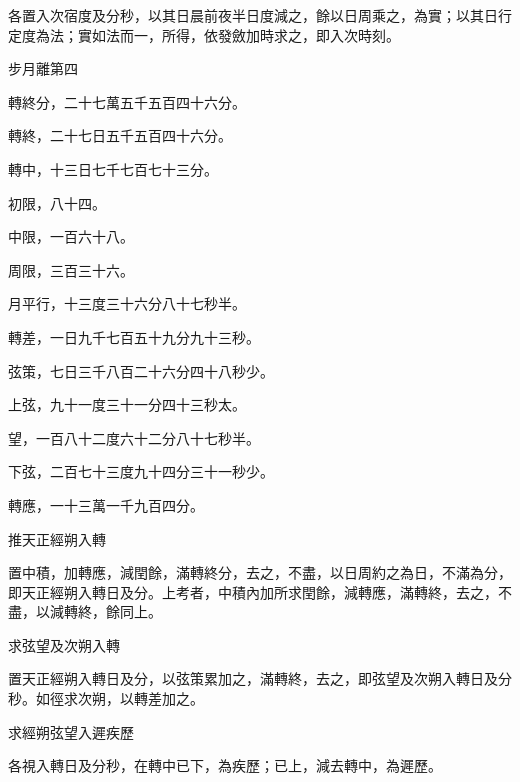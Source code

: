 \begin{pinyinscope}
 各置入次宿度及分秒，以其日晨前夜半日度減之，餘以日周乘之，為實；以其日行定度為法；實如法而一，所得，依發斂加時求之，即入次時刻。



 步月離第四



 轉終分，二十七萬五千五百四十六分。



 轉終，二十七日五千五百四十六分。



 轉中，十三日七千七百七十三分。



 初限，八十四。



 中限，一百六十八。



 周限，三百三十六。



 月平行，十三度三十六分八十七秒半。



 轉差，一日九千七百五十九分九十三秒。



 弦策，七日三千八百二十六分四十八秒少。



 上弦，九十一度三十一分四十三秒太。



 望，一百八十二度六十二分八十七秒半。



 下弦，二百七十三度九十四分三十一秒少。



 轉應，一十三萬一千九百四分。



 推天正經朔入轉



 置中積，加轉應，減閏餘，滿轉終分，去之，不盡，以日周約之為日，不滿為分，即天正經朔入轉日及分。上考者，中積內加所求閏餘，減轉應，滿轉終，去之，不盡，以減轉終，餘同上。



 求弦望及次朔入轉



 置天正經朔入轉日及分，以弦策累加之，滿轉終，去之，即弦望及次朔入轉日及分秒。如徑求次朔，以轉差加之。



 求經朔弦望入遲疾歷



 各視入轉日及分秒，在轉中已下，為疾歷；已上，減去轉中，為遲歷。




\end{pinyinscope}
